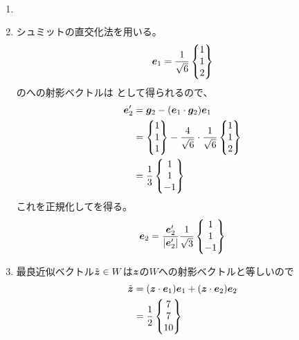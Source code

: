 \begin{ans*}
  ${}$
  \begin{enumerate}[label=(\arabic*)]
    \item {}
    \item シュミットの直交化法を用いる。
    \begin{align}
      {\bm{e}}_{1} = \frac{1}{\sqrt{6}}\begin{Bmatrix}
        1 \\ 1 \\ 2
      \end{Bmatrix}
    \end{align}
    のへの射影ベクトルは
    として得られるので、
    \begin{align}
      {\bm{e}}'_{2}
      &= {\bm{g}}_{2} - ({\bm{e}}_{1}\cdot{\bm{g}}_{2}){\bm{e}}_{1} \\
      &= \begin{Bmatrix}1\\1\\1\end{Bmatrix} - \frac{4}{\sqrt{6}}\cdot\frac{1}{\sqrt{6}}\begin{Bmatrix}1\\1\\2\end{Bmatrix} \\
      &= \frac{1}{3}\begin{Bmatrix}1\\1\\-1\end{Bmatrix}
    \end{align}
    これを正規化してを得る。
    \begin{gather}
      {\bm{e}}_{2} = \frac{{\bm{e}}'_{2}}{|{\bm{e}}'_{2}|}\frac{1}{\sqrt{3}}\begin{Bmatrix}1\\1\\-1\end{Bmatrix}
    \end{gather}
    \item 最良近似ベクトル$\tilde{{\bm{z}}}\in W$は${\bm{z}}$の$W$への射影ベクトルと等しいので
    \begin{align}
      \tilde{{\bm{z}}}
      &= ({\bm{z}}\cdot {\bm{e}}_{1}){\bm{e}}_{1} + ({\bm{z}}\cdot {\bm{e}}_{2}){\bm{e}}_{2} \\
      &= \frac{1}{2}\begin{Bmatrix}7 \\ 7 \\ 10\end{Bmatrix}
    \end{align}
  \end{enumerate}
\end{ans*}
